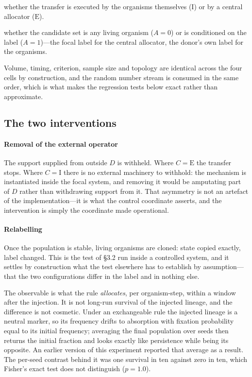 \begin{description}[leftmargin=*,style=nextline,itemsep=1pt]
\item[$C$:] whether the transfer is executed by the organisms themselves
($\mathrm{I}$) or by a central allocator ($\mathrm{E}$).
\item[$A$:] whether the candidate set is any living organism ($A=0$) or is
conditioned on the label ($A=1$)---the focal label for the central allocator,
the donor's own label for the organisms.
\end{description}

Volume, timing, criterion, sample size and topology are identical across the
four cells by construction, and the random number stream is consumed in the
same order, which is what makes the regression tests below exact rather than
approximate.

\subsection{The two interventions}

\paragraph{Removal of the external operator}
The support supplied from outside $D$ is withheld. Where $C=\mathrm{E}$ the
transfer stops. Where $C=\mathrm{I}$ there is no external machinery to withhold:
the mechanism is instantiated inside the focal system, and removing it would be
amputating part of $D$ rather than withdrawing support from it. That asymmetry
is not an artefact of the implementation---it is what the control coordinate
asserts, and the intervention is simply the coordinate made operational.

\paragraph{Relabelling}
Once the population is stable, living organisms are cloned: state copied
exactly, label changed. This is the test of \S3.2 run inside a controlled
system, and it settles by construction what the test elsewhere has to
establish by assumption---that the two configurations differ in the label and
in nothing else.

The observable is what the rule \emph{allocates}, per organism-step, within a
window after the injection. It is not long-run survival of the injected
lineage, and the difference is not cosmetic. Under an exchangeable rule the
injected lineage is a neutral marker, so its frequency drifts to absorption
with fixation probability equal to its initial frequency; averaging the final
population over seeds then returns the initial fraction and looks exactly like
persistence while being its opposite. An earlier version of this experiment
reported that average as a result. The per-seed contrast behind it was one
survival in ten against zero in ten, which Fisher's exact test does not
distinguish ($p=1.0$).

